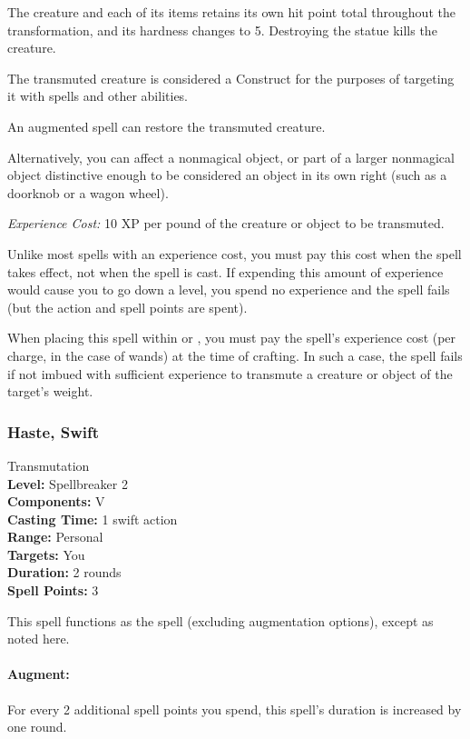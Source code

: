 The creature and each of its items retains its own hit point total throughout the transformation, and its hardness changes to 5.
Destroying the statue kills the creature.

The transmuted creature is considered a Construct for the purposes of targeting it with spells and other abilities.

An augmented  spell can restore the transmuted creature.

Alternatively, you can affect a nonmagical object, or part of a larger nonmagical object distinctive enough to be considered an object in its own right (such as a doorknob or a wagon wheel).

\emph{Experience Cost:} 10 XP per pound of the creature or object to be transmuted.

Unlike most spells with an experience cost, you must pay this cost when the spell takes effect, not when the spell is cast.
If expending this amount of experience would cause you to go down a level, you spend no experience and the spell fails (but the action and spell points are spent).

When placing this spell within  or , you must pay the spell's experience cost (per charge, in the case of wands) at the time of crafting. In such a case, the spell fails if not imbued with sufficient experience to transmute a creature or object of the target's weight.
\subsubsection[Swift Haste]{Haste, Swift}
\label{Spell:SwiftHaste}
Transmutation
\\ \textbf{Level:} Spellbreaker 2
\\ \textbf{Components:} V
\\ \textbf{Casting Time:} 1 swift action
\\ \textbf{Range:} Personal
\\ \textbf{Targets:} You
\\ \textbf{Duration:} 2 rounds
\\ \textbf{Spell Points:} 3

This spell functions as the  spell (excluding augmentation options), except as noted here.

\paragraph{Augment:} For every 2 additional spell points you spend, this spell's duration is increased by one round.

